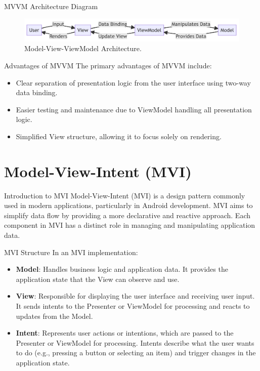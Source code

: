 \documentclass[aspectratio=169, table]{beamer}
\begin{document}
\begin{frame}[fragile]{MVVM Architecture Diagram}
	\vspace{20pt}
	\begin{figure}[h]
		\centering
		\includegraphics[width=\textwidth]{../images/mvvm.png}
		\caption{Model-View-ViewModel Architecture.}
		\label{fig:mvvm-architecture}
	\end{figure}
\end{frame}

\begin{frame}[fragile]{Advantages of MVVM}
	\vspace{20pt}
	The primary advantages of MVVM include:
	\begin{itemize}
		\item Clear separation of presentation logic from the user interface using two-way data binding.
		\item Easier testing and maintenance due to ViewModel handling all presentation logic.
		\item Simplified View structure, allowing it to focus solely on rendering.
	\end{itemize}
\end{frame}

\section{Model-View-Intent (MVI)}

\begin{frame}[fragile]{Introduction to MVI}
	\vspace{20pt}
	Model-View-Intent (MVI) is a design pattern commonly used in modern applications, particularly in Android development. 
	MVI aims to simplify data flow by providing a more declarative and reactive approach. 
	Each component in MVI has a distinct role in managing and manipulating application data.
\end{frame}

\begin{frame}[fragile]{MVI Structure}
	\vspace{20pt}
	In an MVI implementation:
	\begin{itemize}
		\item \textbf{Model}: Handles business logic and application data. It provides the application state that the View can observe and use.
		\item \textbf{View}: Responsible for displaying the user interface and receiving user input. It sends intents to the Presenter or ViewModel for processing and reacts to updates from the Model.
		\item \textbf{Intent}: Represents user actions or intentions, which are passed to the Presenter or ViewModel for processing. Intents describe what the user wants to do (e.g., pressing a button or selecting an item) and trigger changes in the application state.
	\end{itemize}
\end{frame}
\end{document}
